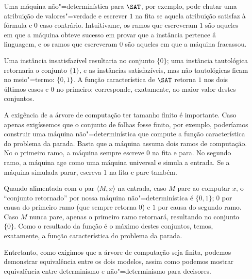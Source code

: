 Uma máquina não"=determinística para $\SAT$,
por exemplo,
pode chutar uma atribuição de valores"=verdade
e escrever $1$ na fita se aquela atribuição satisfaz à fórmula
e $0$ caso contrário.
Intuitivame, os ramos que escreveram $1$ são aqueles em que
a máquina obteve sucesso em provar que a instância pertence â linguagem,
e os ramos que escreveram $0$ são aqueles em que a máquina fracassou.

Uma instância insatisfazível resultaria no conjunto $\{0\}$;
uma instância tautológica retornaria o conjunto $\{1\}$,
e as instâncias satisfazíveis, mas não tautológicas
ficam no meio"=termo: $\{0, 1\}$.
A função característica de $\SAT$ retorna $1$ nos dois últimos casos
e $0$ no primeiro;
corresponde, exatamente,
ao maior valor destes conjuntos.

A exigência de a árvore de computação ter tamanho finito é importante.
Caso apenas exigíssemos que o conjunto de folhas fosse finito, por exemplo,
poderíamos construir uma máquina não"=determinística
que compute a função característica do problema da parada.
Basta que a máquina assuma dois ramos de computação.
No o primeiro ramo, a máquina sempre escreve $0$ na fita e para.
No segundo ramo,
a máquina age como uma máquina universal e simula a entrada.
Se a máquina simulada parar, escreva $1$ na fita e pare também.

Quando alimentada com o par $\langle M, x \rangle$ na entrada,
caso $M$ pare ao computar $x$,
o ``conjunto retornado'' por nossa máquina não"=determinística é $\{0, 1\}$;
$0$ por causa do primeiro ramo (que sempre retorna $0$)
e $1$ por causa do segundo ramo.
Caso $M$ nunca pare, apenas o primeiro ramo retornará,
resultando no conjunto $\{0\}$.
Como o resultado da função é o máximo destes conjuntos,
temos, exatamente,
a função característica do problema da parada.

Entretanto, como exigimos que a árvore de computação seja finita,
podemos demonstrar equivalência entre os dois modelos,
assim como podemos mostrar equivalência entre determinismo e não"=determinismo
para decisores.

